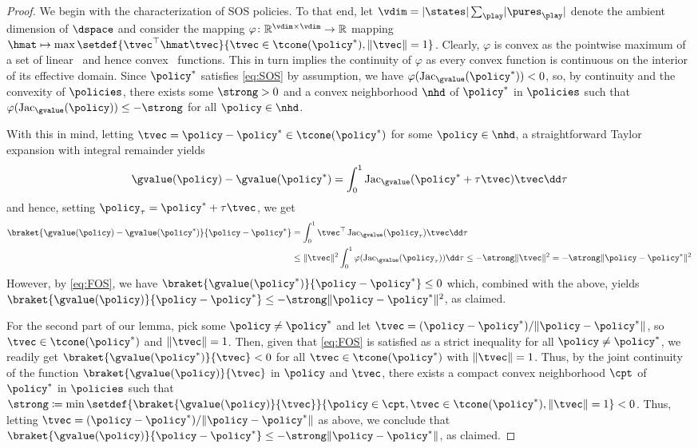 \StationaryProperties*

\begin{proof}
We begin with the characterization of \acl{SOS} policies.
To that end, let $\vdim = \abs{\states} \sum_{\play} \abs{\pures_{\play}}$ denote the ambient dimension of $\dspace$ and consider the mapping $\varphi\from\R^{\vdim\times\vdim} \to \R$ mapping $\hmat \mapsto \max\setdef{\tvec^{\top}\hmat\tvec}{\tvec \in \tcone(\eq), \norm{\tvec} = 1}$.
Clearly, $\varphi$ is convex as the pointwise maximum of a set of linear \textendash\ and hence convex \textendash\ functions.
This in turn implies the continuity of $\varphi$ as every convex function is continuous on the interior of its effective domain.
Since $\eq$ satisfies \eqref{eq:SOS} by assumption, we have $\varphi(\Jac_{\gvalue}(\eq)) < 0$, so, by continuity and the convexity of $\policies$, there exists some $\strong > 0$ and a convex neighborhood $\nhd$ of $\eq$ in $\policies$ such that $\varphi(\Jac_{\gvalue}(\policy)) \leq -\strong$ for all $\policy \in \nhd$.

With this in mind, letting $\tvec = \policy-\eq \in \tcone(\eq)$ for some $\policy\in\nhd$, a straightforward Taylor expansion with integral remainder yields
\begin{equation}
\gvalue(\policy) - \gvalue(\eq)
	= \int_{0}^{1} \Jac_{\gvalue}(\eq + \tau\tvec) \tvec \dd\tau
\end{equation}
and hence, setting $\policy_{\tau} = \eq + \tau\tvec$, we get
\begin{align}
\braket{\gvalue(\policy) - \gvalue(\eq)}{\policy - \eq}
	&= \int_{0}^{1} \tvec^{\top} \Jac_{\gvalue}(\policy_{\tau}) \tvec \dd\tau
	\notag\\
	&\leq \norm{\tvec}^{2}
		\int_{0}^{1} \varphi(\Jac_{\gvalue}(\policy_{\tau})) \dd\tau
	\leq -\strong \norm{\tvec}^{2}
	= -\strong \norm{\policy - \eq}^{2}
\end{align}
However, by \eqref{eq:FOS}, we have $\braket{\gvalue(\eq)}{\policy - \eq} \leq 0$ which, combined with the above, yields $\braket{\gvalue(\policy)}{\policy - \eq} \leq -\strong \norm{\policy - \eq}^{2}$, as claimed.

For the second part of our lemma, pick some $\policy\neq\eq$ and let $\tvec = (\policy-\eq) / \norm{\policy-\eq}$, so $\tvec \in \tcone(\eq)$ and $\norm{\tvec} = 1$.
Then, given that \eqref{eq:FOS} is satisfied as a strict inequality for all $\policy\neq\eq$, we readily get $\braket{\gvalue(\eq)}{\tvec} < 0$ for all $\tvec\in\tcone(\eq)$ with $\norm{\tvec} = 1$.
Thus, by the joint continuity of the function $\braket{\gvalue(\policy)}{\tvec}$ in $\policy$ and $\tvec$, there exists a compact convex neighborhood $\cpt$ of $\eq$ in $\policies$ such that $\strong \defeq \min\setdef{\braket{\gvalue(\policy)}{\tvec}}{\policy\in\cpt,\tvec\in\tcone(\eq),\norm{\tvec}=1} < 0$.
Thus, letting $\tvec = (\policy-\eq) / \norm{\policy-\eq}$ as above, we conclude that $\braket{\gvalue(\policy)}{\policy - \eq} \leq -\strong \norm{\policy - \eq}$, as claimed.
\end{proof}


